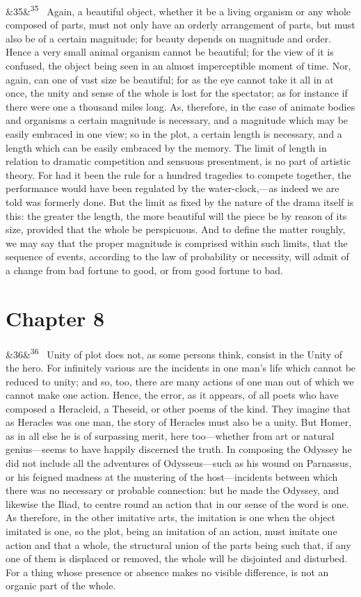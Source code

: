 \documentclass[12pt]{article}
\newcommand{\para}[1][]{\par\noindent\ifx&#1&\else\textsuperscript{\footnotesize #1}~\fi}
\begin{document}
\para[35] Again, a beautiful object, whether it be a living organism or any whole composed of parts, must not only have an orderly arrangement of parts, but must also be of a certain magnitude; for beauty depends on magnitude and order. Hence a very small animal organism cannot be beautiful; for the view of it is confused, the object being seen in an almost imperceptible moment of time. Nor, again, can one of vast size be beautiful; for as the eye cannot take it all in at once, the unity and sense of the whole is lost for the spectator; as for instance if there were one a thousand miles long. As, therefore, in the case of animate bodies and organisms a certain magnitude is necessary, and a magnitude which may be easily embraced in one view; so in the plot, a certain length is necessary, and a length which can be easily embraced by the memory. The limit of length in relation to dramatic competition and sensuous presentment, is no part of artistic theory. For had it been the rule for a hundred tragedies to compete together, the performance would have been regulated by the water-clock,---as indeed we are told was formerly done. But the limit as fixed by the nature of the drama itself is this: the greater the length, the more beautiful will the piece be by reason of its size, provided that the whole be perspicuous. And to define the matter roughly, we may say that the proper magnitude is comprised within such limits, that the sequence of events, according to the law of probability or necessity, will admit of a change from bad fortune to good, or from good fortune to bad.

\section*{Chapter 8}

\para[36] Unity of plot does not, as some persons think, consist in the Unity of the hero. For infinitely various are the incidents in one man's life which cannot be reduced to unity; and so, too, there are many actions of one man out of which we cannot make one action. Hence, the error, as it appears, of all poets who have composed a Heracleid, a Theseid, or other poems of the kind. They imagine that as Heracles was one man, the story of Heracles must also be a unity. But Homer, as in all else he is of surpassing merit, here too---whether from art or natural genius---seems to have happily discerned the truth. In composing the Odyssey he did not include all the adventures of Odysseus---such as his wound on Parnassus, or his feigned madness at the mustering of the host---incidents between which there was no necessary or probable connection: but he made the Odyssey, and likewise the Iliad, to centre round an action that in our sense of the word is one. As therefore, in the other imitative arts, the imitation is one when the object imitated is one, so the plot, being an imitation of an action, must imitate one action and that a whole, the structural union of the parts being such that, if any one of them is displaced or removed, the whole will be disjointed and disturbed. For a thing whose presence or absence makes no visible difference, is not an organic part of the whole.
\end{document}
